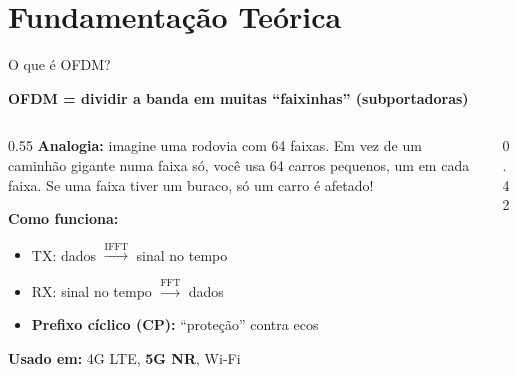 \documentclass[aspectratio=169, 11pt]{beamer}
\begin{document}
\section{Fundamentação Teórica}

\begin{frame}{O que é OFDM?}

    \textbf{OFDM = dividir a banda em muitas ``faixinhas'' (subportadoras)}

    \pause
    \vspace{0.3cm}
    \begin{columns}[T]
        \begin{column}{0.55\textwidth}
            \textbf{Analogia:} imagine uma rodovia com 64 faixas. Em vez de um caminhão gigante numa faixa só, você usa 64 carros pequenos, um em cada faixa. Se uma faixa tiver um buraco, só um carro é afetado!

            \pause
            \vspace{0.3cm}
            \textbf{Como funciona:}
            \begin{itemize}
                \item TX: dados $\xrightarrow{\text{IFFT}}$ sinal no tempo
                \item RX: sinal no tempo $\xrightarrow{\text{FFT}}$ dados
                \item \textbf{Prefixo cíclico (CP):} ``proteção'' contra ecos
            \end{itemize}

            \pause
            \vspace{0.3cm}
            \textbf{Usado em:} 4G LTE, \textbf{5G NR}, Wi-Fi
        \end{column}
        \begin{column}{0.42\textwidth}


\end{column}
\end{columns}
\end{frame}
\end{document}
